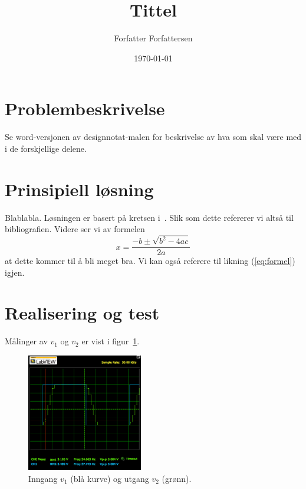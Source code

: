 \documentclass[11pt,norsk]{elsys-design}
\title{Tittel}
\author{Forfatter Forfattersen}
\date{\today}
\begin{document}
\maketitle

\toc

\section{Problembeskrivelse}
\label{sec:innledning}

Se word-versjonen av designnotat-malen for beskrivelse av hva som skal være med i de forskjellige delene.

\section{Prinsipiell løsning}
\label{sec:prinsipielllosning}

Blablabla. Løsningen er basert på kretsen i~\cite[s. 1604]{bibelen}. Slik som dette refererer vi altså til bibliografien. Videre ser vi av formelen
\begin{equation}
	\label{eq:formel}
	x = \frac{-b \pm \sqrt{b^{2}-4ac}}{2a}
\end{equation}
at dette kommer til å bli meget bra. Vi kan også referere til likning (\ref{eq:formel}) igjen.

\section{Realisering og test}
\label{sec:realisering}

Målinger av $v_1$ og $v_2$ er vist i figur~\ref{fig:resultat}.
\begin{figure}[htbp]
	\centering
	\includegraphics[width=0.45\textwidth]{skop} 
	\caption{Inngang $v_1$ (blå kurve) og utgang $v_2$ (grønn).}
	\label{fig:resultat}
\end{figure}
\end{document}
